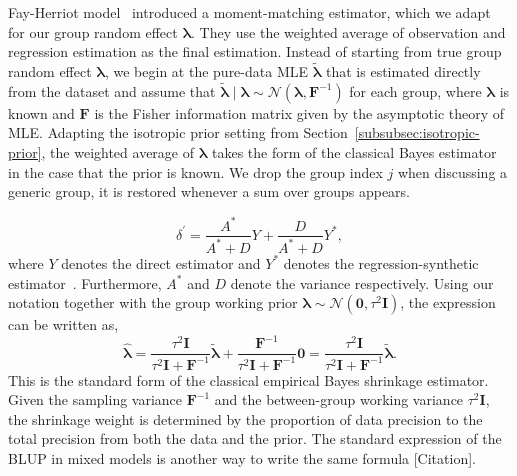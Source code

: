 Fay-Herriot model~\citep{Herriot1979} introduced a moment-matching estimator, which we adapt for our group random effect $\bm{\lambda}$. They use the weighted average of observation and regression estimation as the final estimation. Instead of starting from true group random effect $\bm{\lambda}$, we begin at the pure-data MLE $\tilde{\bm{\lambda}}$ that is estimated directly from the dataset and assume that $\tilde{\bm{\lambda}}\mid\bm{\lambda}\sim\mathcal{N}\left(\bm{\lambda},\mathbf{F}^{-1}\right)$ for each group, where $\bm{\lambda}$ is known and $\mathbf{F}$ is the Fisher information matrix given by the asymptotic theory of MLE. Adapting the isotropic prior setting from Section~\ref{subsubsec:isotropic-prior}, the weighted average of $\hat{\bm{\lambda}}$ takes the form of the classical Bayes estimator in the case that the prior is known. We drop the group index $j$ when discussing a generic group, it is restored whenever a sum over groups appears. 

\begin{equation}
    \delta^{'}=\frac{A^{*}}{A^{*}+D}Y+\frac{D}{A^{*}+D}Y^{*},
    \label{eq:classical-bayes1}
\end{equation}
where $Y$ denotes the direct estimator and $Y^{*}$ denotes the regression-synthetic estimator~\citep{Herriot1979, Pfeffermann2011}. Furthermore, $A^{*}$ and $D$ denote the variance respectively. Using our notation together with the group working prior $\bm{\lambda}\sim \mathcal{N}\left(\bm{0}, \tau^{2}\mathbf{I}\right)$, the expression can be written as,
\begin{equation}
    \hat{\bm{\lambda}}=\frac{\tau^{2}\mathbf{I}}{\tau^{2}\mathbf{I}+\mathbf{F}^{-1}}\tilde{\bm{\lambda}}+\frac{\mathbf{F}^{-1}}{\tau^{2}\mathbf{I}+\mathbf{F}^{-1}}\bm{0}=\frac{\tau^{2}\mathbf{I}}{\tau^{2}\mathbf{I}+\mathbf{F}^{-1}}\tilde{\bm{\lambda}}.
    \label{eq:classical-bayes2}
\end{equation}
This is the standard form of the classical empirical Bayes shrinkage estimator. Given the sampling variance $\mathbf{F}^{-1}$ and the between-group working variance $\tau^{2}\mathbf{I}$, the shrinkage weight is determined by the proportion of data precision to the total precision from both the data and the prior. The standard expression of the BLUP in mixed models is another way to write the same formula [Citation].

